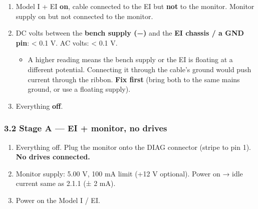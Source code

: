 \documentclass[
  10pt,
]{article}
\providecommand{\tightlist}{%
  \setlength{\itemsep}{0pt}\setlength{\parskip}{0pt}}
\begin{document}
\begin{enumerate}
\def\labelenumi{\arabic{enumi}.}
\tightlist
\item
  Model I + EI \textbf{on}, cable connected to the EI but
  \textbf{not} to the monitor. Monitor supply on but not
  connected to the monitor.
\item
  DC volts between the \textbf{bench supply (−)} and the
  \textbf{EI chassis / a GND pin}: \textless{} 0.1 V. AC
  volts: \textless{} 0.1 V.

  \begin{itemize}
  \tightlist
  \item
    A higher reading means the bench supply or the EI is
    floating at a different potential. Connecting it through
    the cable's ground would push current through the
    ribbon. \textbf{Fix first} (bring both to the same mains
    ground, or use a floating supply).
  \end{itemize}
\item
  Everything \textbf{off}.
\end{enumerate}

\hypertarget{stage-a-ei-monitor-no-drives}{%
\subsubsection{3.2 Stage A --- EI + monitor, no
drives}\label{stage-a-ei-monitor-no-drives}}

\begin{enumerate}
\def\labelenumi{\arabic{enumi}.}
\tightlist
\item
  Everything off. Plug the monitor onto the DIAG connector
  (stripe to pin 1). \textbf{No drives connected.}
\item
  Monitor supply: 5.00 V, 100 mA limit (+12 V optional).
  Power on → idle current same as 2.1.1 (± 2 mA).
\item
  Power on the Model I / EI.
\end{enumerate}
\end{document}
